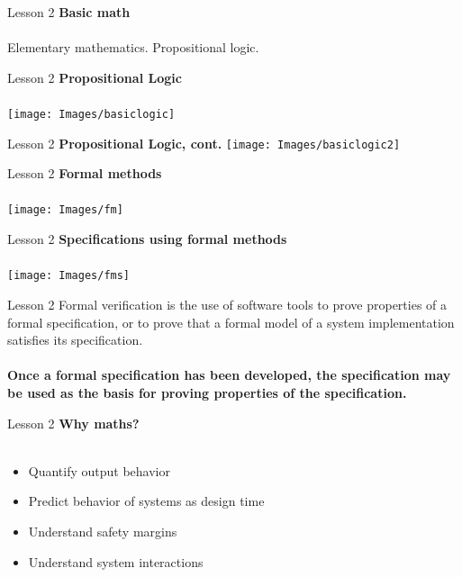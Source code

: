 \documentclass[aspectratio=1610]{beamer}
\begin{document}
\begin{frame}{Lesson 2}{}
\LARGE
\textbf{Basic math}\\~\\
Elementary mathematics. Propositional logic.
\end{frame}


\begin{frame}{Lesson 2}{}
\LARGE
\textbf{Propositional Logic}\\~\\
\texttt{[image: Images/basiclogic]}
\end{frame}


\begin{frame}{Lesson 2}{}
\LARGE
\textbf{Propositional Logic, cont.}
\texttt{[image: Images/basiclogic2]}
\end{frame}



\begin{frame}{Lesson 2}{}
\LARGE
\textbf{Formal methods}\\~\\
\texttt{[image: Images/fm]}
\end{frame}


\begin{frame}{Lesson 2}{}
\LARGE
\textbf{Specifications using formal methods}\\~\\
\texttt{[image: Images/fms]}
\end{frame}


\begin{frame}{Lesson 2}{}
\LARGE
    Formal verification is the use of software tools to prove properties of a formal specification, or to prove that a formal model of a system implementation satisfies its specification.\\~\\
\textbf{Once a formal specification has been developed, the specification may be used as the basis for proving properties of the specification.}
\end{frame}

\begin{frame}{Lesson 2}{}
\LARGE
\textbf{Why maths?}\\~\\
\begin{itemize}
    \item Quantify output behavior
    \item Predict behavior of systems as design time
    \item Understand safety margins
    \item Understand system interactions
\end{itemize}
\end{frame}
\end{document}
